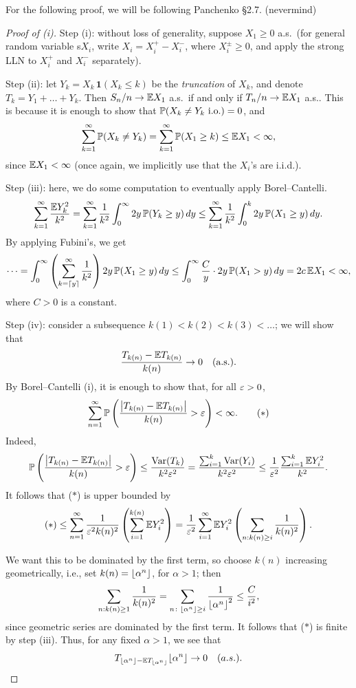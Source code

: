 For the following proof, we will be following Panchenko \S2.7. {\color{airforceblue}(nevermind)}
\begin{proof}[Proof of (i)]
    Step (i): without loss of generality, suppose $X_1 \geq 0$ a.s.\ (for general random variable s$X_i$, write $X_i = X_i^+ - X_i^-$, where $X_i^\pm \geq 0$, and apply the strong LLN to $X_i^+$ and $X_i^-$ separately).

    Step (ii): let $Y_k = X_k \, \mathbf 1(X_k \leq k)$ be the \textit{truncation} of $X_k$, and denote $T_k = Y_1 + \dots + Y_k$. Then $S_n/n \to \mathbb E X_1$ a.s.\ if and only if $T_n/n \to \mathbb E X_1$ a.s.. This is because it is enough to show that $\mathbb P(X_k \neq Y_k \text{ i.o.}) = 0$, and
    \[ \sum_{k=1}^\infty \mathbb P(X_k \neq Y_k) = \sum_{k=1}^\infty \mathbb P(X_1 \geq k) \leq \mathbb E X_1 < \infty, \]
    since $\mathbb E X_1 < \infty$ (once again, we implicitly use that the $X_i$'s are i.i.d.).

    Step (iii): here, we do some computation to eventually apply Borel--Cantelli.
    \[ \sum_{k=1}^\infty \frac{\mathbb E Y_k^2}{k^2} = \sum_{k=1}^\infty \frac{1}{k^2} \int_0^\infty 2y \, \mathbb P(Y_k \geq y) \, dy \leq \sum_{k=1}^\infty \frac{1}{k^2} \int_0^k 2y \, \mathbb P(X_1 \geq y) \, dy. \]
    By applying Fubini's, we get
    \[ \dots = \int_0^\infty \left(\sum_{k=\lceil{y}\rceil}^\infty \frac{1}{k^2}\right) 2y \, \mathbb P(X_1 \geq y) \, dy \leq \int_0^\infty \frac{C}{y} \cdot 2y \, \mathbb P(X_1 > y) \, dy = 2c \, \mathbb E X_1 < \infty, \]
    where $C > 0$ is a constant.

    Step (iv): consider a subsequence $k(1) < k(2) < k(3) < \dots$; we will show that
    \[ \frac{T_{k(n)} - \mathbb E T_{k(n)}}{k(n)} \to 0 \quad \text{(a.s.)}. \]
    By Borel--Cantelli (i), it is enough to show that, for all $\varepsilon > 0$,
    \[ \sum_{n=1}^\infty \mathbb P\left(\frac{\left\lvert T_{k(n)} - \mathbb E T_{k(n)} \right\rvert}{k(n)} > \varepsilon\right) < \infty. \tag{$\ast$} \]
    Indeed,
    \[ \mathbb P\left(\frac{\left\lvert T_{k(n)} - \mathbb E T_{k(n)} \right\rvert}{k(n)} > \varepsilon\right) \leq \frac{\operatorname{Var}(T_k)}{k^2 \varepsilon^2} = \frac{\sum_{i=1}^k \operatorname{Var}(Y_i)}{k^2 \varepsilon^2} \leq \frac{1}{\varepsilon^2} \frac{\sum_{i=1}^k \mathbb E Y_i^2}{k^2}. \]
    It follows that ($\ast$) is upper bounded by
    \[ (\ast) \leq \sum_{n=1}^\infty \frac{1}{\varepsilon^2 k(n)^2} \left(\sum_{i=1}^{k(n)} \mathbb E Y_i^2\right) = \frac{1}{\varepsilon^2} \sum_{i=1}^\infty \mathbb E Y_i^2 \left(\sum_{n : k(n) \geq i} \frac{1}{k(n)^2}\right). \]

    \newpage
    We want this to be dominated by the first term, so choose $k(n)$ increasing geometrically, i.e., set $k(n) = \left\lfloor \alpha^n \right\rfloor$, for $\alpha > 1$; then
    \[ \sum_{n : k(n) \geq 1} \frac{1}{k(n)^2} = \sum_{n \colon \left\lfloor \alpha^n \right\rfloor \geq i} \frac{1}{\left\lfloor \alpha^n \right\rfloor^2} \leq \frac{C}{i^2}, \]
    since geometric series are dominated by the first term. It follows that ($\ast$) is finite by step (iii). Thus, for any fixed $\alpha > 1$, we see that
    \[ T_{\left\lfloor \alpha^n \right\rfloor - \mathbb E T_{\left\lfloor \alpha^n \right\rfloor}}{\left\lfloor \alpha^n \right\rfloor} \to 0 \quad (a.s.). \]


\end{proof}
